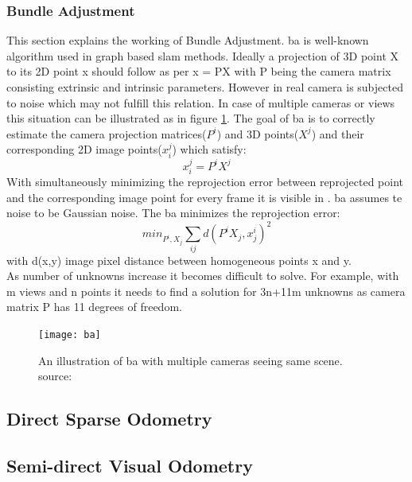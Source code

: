 \subsubsection{Bundle Adjustment}
This section explains the working of Bundle Adjustment. \acrshort{ba} is well-known algorithm used in graph based \acrshort{slam} methods. Ideally a projection of 3D point X to its 2D point x should follow as per x = PX with P being the camera matrix consisting extrinsic and intrinsic parameters. However in real camera is subjected to noise which may not fulfill this relation. In case of multiple cameras or views this situation can be illustrated as in figure \ref{fig:ba}. The goal of \acrshort{ba} is to correctly estimate the camera projection matrices($ P^{i}$) and 3D points($X^{j}$) and their corresponding 2D image points($ x_{i}^{j} $) which satisfy:
\begin{equation*}
 x_{i}^{j} = P^{i}X^{j}
\end{equation*} 
With simultaneously minimizing the reprojection error between reprojected point and the corresponding image point for every frame it is visible in \cite{multiview_geometry}. \acrshort{ba} assumes te noise to be Gaussian noise. The \acrshort{ba} minimizes the reprojection error:
\begin{equation*}
 min_{P^{i},X_{j}} \sum_{ij} d(P^{i}X_{j},x_{j}^{i})^{2}
\end{equation*} 
with d(x,y) image pixel distance between homogeneous points x and y. \\
\newline 
As number of unknowns increase it becomes difficult to solve. For example, with m views and n points it needs to find a solution for 3n+11m unknowns as camera matrix P has 11 degrees of freedom.

\begin{figure}[h]
	\centering
	\texttt{[image: ba]}
	\caption{An illustration of \acrshort{ba} with multiple cameras seeing same scene. source:\cite{sfm}}
	\label{fig:ba}
\end{figure}

\subsection{Direct Sparse Odometry}

\subsection{Semi-direct Visual Odometry}




